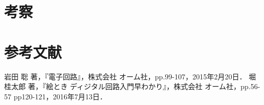\documentclass[a4paper,11pt,dvipdfmx]{jsarticle}
\begin{document}
\section{考察}

\section{参考文献}
\begin{thebibliography}{99}
  岩田 聡 著，『電子回路』，株式会社 オーム社，pp.99-107，2015年2月20日．
  堀 桂太郎 著，『絵とき ディジタル回路入門早わかり』，株式会社 オーム社，pp.56-57 pp120-121，2016年7月13日．
\end{thebibliography}
\end{document}
